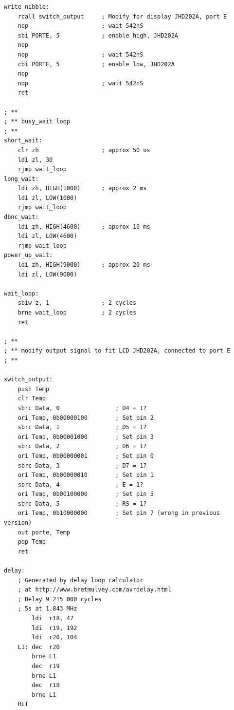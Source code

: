 \documentclass[a4paper,12pt]{article}
\begin{document}
\begin{lstlisting}
write_nibble:
	rcall switch_output		; Modify for display JHD202A, port E
	nop						; wait 542nS
	sbi PORTE, 5			; enable high, JHD202A
	nop
	nop						; wait 542nS
	cbi PORTE, 5			; enable low, JHD202A
	nop
	nop						; wait 542nS
	ret

; **
; ** busy_wait loop
; **
short_wait:
	clr zh					; approx 50 us
	ldi zl, 30
	rjmp wait_loop
long_wait:
	ldi zh, HIGH(1000)		; approx 2 ms
	ldi zl, LOW(1000)
	rjmp wait_loop
dbnc_wait:
	ldi zh, HIGH(4600)		; approx 10 ms
	ldi zl, LOW(4600)
	rjmp wait_loop
power_up_wait:
	ldi zh, HIGH(9000)		; approx 20 ms
	ldi zl, LOW(9000)

wait_loop:
	sbiw z, 1				; 2 cycles
	brne wait_loop			; 2 cycles
	ret

; **
; ** modify output signal to fit LCD JHD202A, connected to port E
; **

switch_output:
	push Temp
	clr Temp
	sbrc Data, 0				; D4 = 1?
	ori Temp, 0b00000100		; Set pin 2
	sbrc Data, 1				; D5 = 1?
	ori Temp, 0b00001000		; Set pin 3
	sbrc Data, 2				; D6 = 1?
	ori Temp, 0b00000001		; Set pin 0
	sbrc Data, 3				; D7 = 1?
	ori Temp, 0b00000010		; Set pin 1
	sbrc Data, 4				; E = 1?
	ori Temp, 0b00100000		; Set pin 5
	sbrc Data, 5				; RS = 1?
	ori Temp, 0b10000000		; Set pin 7 (wrong in previous version)
	out porte, Temp
	pop Temp
	ret

delay:
	; Generated by delay loop calculator
	; at http://www.bretmulvey.com/avrdelay.html
	; Delay 9 215 000 cycles
	; 5s at 1.843 MHz
	    ldi  r18, 47
	    ldi  r19, 192
	    ldi  r20, 104
	L1: dec  r20
	    brne L1
	    dec  r19
	    brne L1
	    dec  r18
	    brne L1
	RET

\end{lstlisting}
\break
\end{document}
